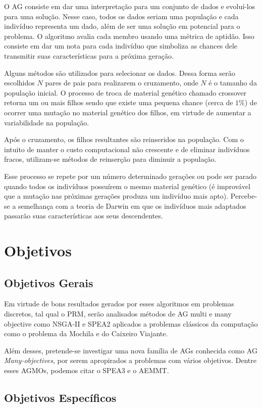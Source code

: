 \documentclass[]{article}
\begin{document}
	O AG consiste em dar uma interpretação para um conjunto de dados e evoluí-los para uma solução. Nesse caso, todos os dados seriam uma população e cada indivíduo representa um dado, além de ser uma solução em potencial para o problema. O algoritmo avalia cada membro usando uma métrica de aptidão. Isso consiste em dar um nota para cada indivíduo que simboliza as chances dele transmitir suas características para a próxima geração.
	
	Alguns métodos são utilizados para selecionar os dados. Dessa forma serão escolhidos $N$ pares de pais para realizarem o cruzamento, onde $N$ é o tamanho da população inicial. O processo de troca de material genético chamado crossover retorna um ou mais filhos sendo que existe uma pequena chance (cerca de $1\%$) de ocorrer uma mutação no material genético dos filhos, em virtude de aumentar a variabilidade na população.
	
	Após o cruzamento, os filhos resultantes são reinseridos na população. Com o intuito de manter o custo computacional não crescente e de eliminar indivíduos fracos, utilizam-se métodos de reinserção para diminuir a população.
	
	Esse processo se repete por um número determinado gerações ou pode ser parado quando todos os indivíduos possuírem o mesmo material genético (é improvável que a mutação nas próximas gerações produza um indivíduo mais apto). 
 	Percebe-se a semelhança com a teoria de Darwin em que os indivíduos mais adaptados passarão suas características aos seus descendentes.
	
\section{Objetivos}
\subsection{Objetivos Gerais}

	Em virtude de bons resultados gerados por esses algoritmos em problemas discretos, tal qual o PRM, serão analisados métodos de AG multi e many objective como NSGA-II e SPEA2 aplicados a problemas clássicos da computação como o problema da Mochila e do Caixeiro Viajante.
	
	Além desses, pretende-se investigar uma nova família de AGs conhecida como AG \textit{Many-objectives}, por serem apropirados a problemas com vários objetivos. Dentre esses AGMOs, podemos citar o SPEA3 e o AEMMT.
	
\subsection{Objetivos Específicos}
\end{document}
